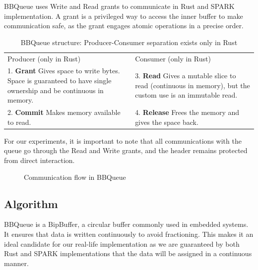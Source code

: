 \documentclass[nomenclature, english, bibtex]{kththesis}
\begin{document}
BBQueue uses Write and Read grants to communicate in Rust and SPARK implementation. A grant is a
privileged way to access the inner buffer to make communication safe, as the grant engages atomic operations in a precise order. 

\begin{table}[ht!]
\footnotesize
\centering
\caption[BBQueue structure]{BBQueue structure: Producer-Consumer separation exists only in Rust}
\label{tab:bbqueue}
\begin{tabular}{ |m{5cm}|m{5cm}| }
\hline
\rowcolor{color1bg_fill}
\multicolumn{2}{|c|}{BBQueue} \\
\hline
\rowcolor{color1bg_fill}
\centering Producer (only in Rust) & \centering Consumer (only in Rust) \tabularnewline
\hline
1. \textbf{Grant} \newline Gives space to write bytes. Space is guaranteed to have single ownership and be continuous in memory. & 3. \textbf{Read} \newline Gives a mutable slice to read (continuous in memory), but the custom use is an immutable read. \tabularnewline
\hline
2. \textbf{Commit} \newline Makes memory available to read. & 4. \textbf{Release} \newline Frees the memory and gives the space back. \tabularnewline
\hline
\end{tabular}
\end{table}
\FloatBarrier
For our experiments, it is important to note that all communications with the queue go through the Read and Write grants, and the header remains protected from direct interaction. 

\begin{figure}[ht!]
  \centering 

\caption{Communication flow in BBQueue}
\end{figure}
\FloatBarrier

\subsection{Algorithm}

BBQueue is a BipBuffer, a circular buffer commonly used in embedded systems. It ensures that data is written continuously to avoid fractioning. This makes it an ideal candidate for our real-life implementation as we are guaranteed by both Rust and SPARK implementations that the data will be assigned in a continuous manner.
\end{document}
